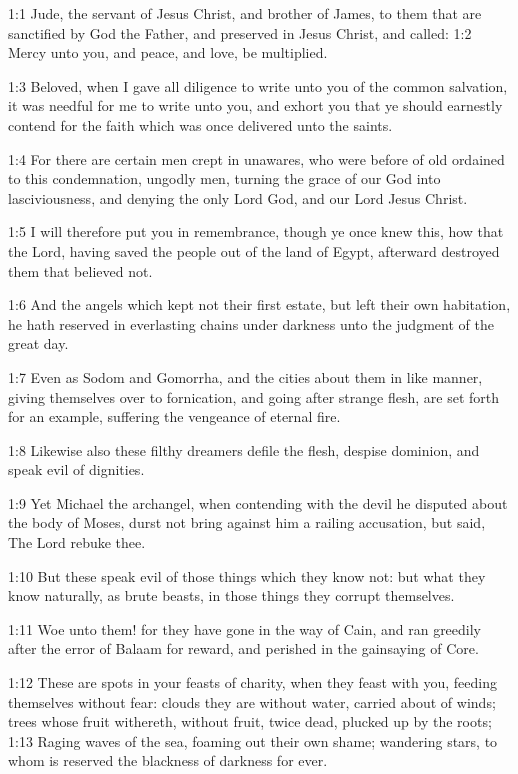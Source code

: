 

1:1 Jude, the servant of Jesus Christ, and brother of James, to them that are sanctified by God the Father, and preserved in Jesus Christ, and called: 1:2 Mercy unto you, and peace, and love, be multiplied.

1:3 Beloved, when I gave all diligence to write unto you of the common salvation, it was needful for me to write unto you, and exhort you that ye should earnestly contend for the faith which was once delivered unto the saints.

1:4 For there are certain men crept in unawares, who were before of old ordained to this condemnation, ungodly men, turning the grace of our God into lasciviousness, and denying the only Lord God, and our Lord Jesus Christ.

1:5 I will therefore put you in remembrance, though ye once knew this, how that the Lord, having saved the people out of the land of Egypt, afterward destroyed them that believed not.

1:6 And the angels which kept not their first estate, but left their own habitation, he hath reserved in everlasting chains under darkness unto the judgment of the great day.

1:7 Even as Sodom and Gomorrha, and the cities about them in like manner, giving themselves over to fornication, and going after strange flesh, are set forth for an example, suffering the vengeance of eternal fire.

1:8 Likewise also these filthy dreamers defile the flesh, despise dominion, and speak evil of dignities.

1:9 Yet Michael the archangel, when contending with the devil he disputed about the body of Moses, durst not bring against him a railing accusation, but said, The Lord rebuke thee.

1:10 But these speak evil of those things which they know not: but what they know naturally, as brute beasts, in those things they corrupt themselves.

1:11 Woe unto them! for they have gone in the way of Cain, and ran greedily after the error of Balaam for reward, and perished in the gainsaying of Core.

1:12 These are spots in your feasts of charity, when they feast with you, feeding themselves without fear: clouds they are without water, carried about of winds; trees whose fruit withereth, without fruit, twice dead, plucked up by the roots; 1:13 Raging waves of the sea, foaming out their own shame; wandering stars, to whom is reserved the blackness of darkness for ever.

